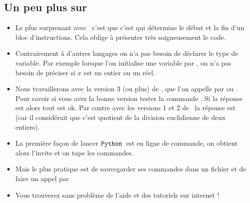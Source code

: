 \documentclass[class=report,crop=false]{standalone}
\begin{document}
\subsection{Un peu plus sur \Python}


\begin{itemize}


  \item Le plus surprenant avec \Python\ c'est que c'est  qui détermine le début et la fin
  d'un bloc d'instructions. Cela oblige à présenter très soigneusement le code.

  \item Contrairement à d'autres langages on n'a pas besoin de déclarer le type de variable.
  Par exemple lorsque l'on initialise une variable par , on n'a pas besoin de préciser
  si $x$ est un entier ou un réel.

  \item Nous travaillerons avec la version 3 (ou plus) de \Python,
  que l'on appelle par  ou .
  Pour savoir si vous avez la bonne version tester la commande .
  Si la réponse est  alors tout est ok.
  Par contre avec les versions 1 et 2 de \Python\ la réponse est  (car il considérait
  que c'est quotient de la division euclidienne de deux entiers).

  \item La première façon de lancer $\texttt{Python}$\ est en ligne de commande, on obtient alors
  l'invite \codeinline{>>>} et on tape les commandes.

  \item Mais le plus pratique est de sauvegarder ses commandes dans un fichier et de faire un appel
  par 

  \item Vous trouverez sans problème de l'aide et des tutoriels sur internet !
\end{itemize}

\end{document}
